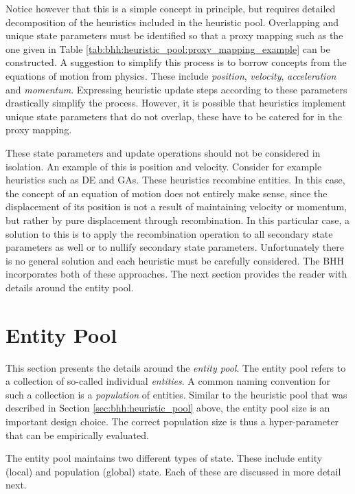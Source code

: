 Notice however that this is a simple concept in principle, but requires detailed decomposition of the heuristics included in the heuristic pool.  Overlapping and unique state parameters must be identified so that a proxy mapping such as the one given in Table \ref{tab:bhh:heuristic_pool:proxy_mapping_example} can be constructed. A suggestion to simplify this process is to borrow concepts from the equations of motion from physics. These include \textit{position}, \textit{velocity}, \textit{acceleration} and \textit{momentum}. Expressing heuristic update steps according to these parameters drastically simplify the process. However, it is possible that heuristics implement unique state parameters that do not overlap, these have to be catered for in the proxy mapping.

These state parameters and update operations should not be considered in isolation. An example of this is position and velocity. Consider for example heuristics such as \acl{DE} and \aclp{GA}. These heuristics recombine entities. In this case, the concept of an equation of motion does not entirely make sense, since the displacement of its position is not a result of maintaining velocity or momentum, but rather by pure displacement through recombination. In this particular case, a solution to this is to apply the recombination operation to all secondary state parameters as well or to nullify secondary state parameters. Unfortunately there is no general solution and each heuristic must be carefully considered. The \ac{BHH} incorporates both of these approaches. The next section provides the reader with details around the entity pool.

\section{Entity Pool}
\label{sec:bhh:entity_pool}

This section presents the details around the \textit{entity pool}. The entity pool refers to a collection of so-called individual \textit{entities}. A common naming convention for such a collection is a \textit{population} of entities. Similar to the heuristic pool that was described in Section \ref{sec:bhh:heuristic_pool} above, the entity pool size is an important design choice. The correct population size is thus a hyper-parameter that can be empirically evaluated.

The entity pool maintains two different types of state. These include entity (local) and population (global) state. Each of these are discussed in more detail next.

